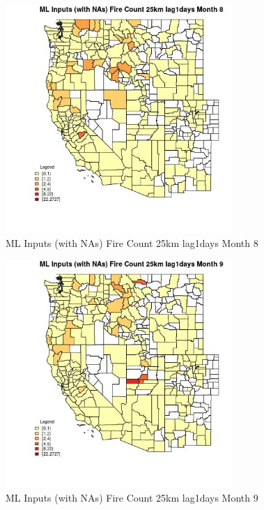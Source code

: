 \begin{figure} 
\centering  
\includegraphics[width=0.77\textwidth]{Code_Outputs/Report_ML_input_PM25_Step4_part_f_de_duplicated_aveswNAs_CountyFire_Count_25km_lag1daysmedianMonth8.jpg} 
\caption{\label{fig:Report_ML_input_PM25_Step4_part_f_de_duplicated_aveswNAsCountyFire_Count_25km_lag1daysmedianMonth8}ML Inputs (with NAs) Fire Count 25km lag1days Month 8} 
\end{figure} 
 

\begin{figure} 
\centering  
\includegraphics[width=0.77\textwidth]{Code_Outputs/Report_ML_input_PM25_Step4_part_f_de_duplicated_aveswNAs_CountyFire_Count_25km_lag1daysmedianMonth9.jpg} 
\caption{\label{fig:Report_ML_input_PM25_Step4_part_f_de_duplicated_aveswNAsCountyFire_Count_25km_lag1daysmedianMonth9}ML Inputs (with NAs) Fire Count 25km lag1days Month 9} 
\end{figure} 
 


